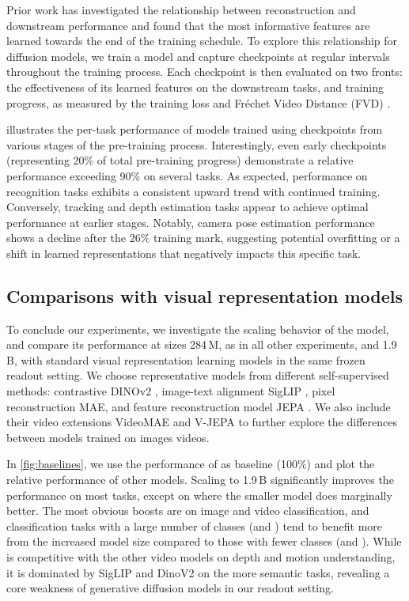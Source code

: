 Prior work has investigated the relationship between reconstruction and downstream performance \cite{balestriero2024learning} and found that the most informative features are learned towards the end of the training schedule.
To explore this relationship for diffusion models, we train a \vwalt model and capture checkpoints at regular intervals throughout the training process.
Each checkpoint is then evaluated on two fronts:
the effectiveness of its learned features on the downstream tasks, and training progress, as measured by the training loss and Fréchet Video Distance (FVD) \cite{unterthiner2018towards}.

 illustrates the per-task performance of models trained using checkpoints from various stages of the pre-training process.  Interestingly, even early checkpoints (representing 20\% of total pre-training progress) demonstrate a relative performance exceeding 90\% on several tasks. As expected, performance on recognition tasks exhibits a consistent upward trend with continued training. Conversely,  tracking and depth estimation tasks appear to achieve optimal performance at earlier stages. Notably, camera pose estimation performance shows a decline after the 26\% training mark, suggesting potential overfitting or a shift in learned representations that negatively impacts this specific task.




\subsection{Comparisons with visual representation models}
\label{sec:exp:baselines}



To conclude our experiments, we investigate the scaling behavior of the \vwalt model, and compare its performance at sizes 284\,M, as in all other experiments, and 1{.}9\,B, with standard visual representation learning models in the same frozen readout setting. 
We choose representative models from different self-supervised methods:
contrastive DINOv2 \cite{caron2021emerging},
image-text alignment SigLIP \cite{chen2023pali},
pixel reconstruction MAE\cite{mae},
and feature reconstruction model JEPA \cite{ijepa}.
We also include their video extensions VideoMAE \cite{tong2022videomae} and V-JEPA \cite{vjepa} to further explore the differences between models trained on images \vs videos.

In \cref{fig:baselines}, we use the performance of \iwalt as baseline (100\%) and plot the relative performance of other models.
Scaling \vwalt to 1{.}9\,B significantly improves the performance on most tasks, except on \Tpt where the smaller model does marginally better.
The most obvious boosts are on image and video classification, and classification tasks with a large number of classes (\Tkseven and \Tinat) tend to benefit more from the increased model size compared to those with fewer classes (\Tkfour and \Timagenet).
While \vwalt is competitive with the other video models on depth and motion understanding, it is dominated by SigLIP and DinoV2 on the more semantic tasks, revealing a core weakness of generative diffusion models in our readout setting.



